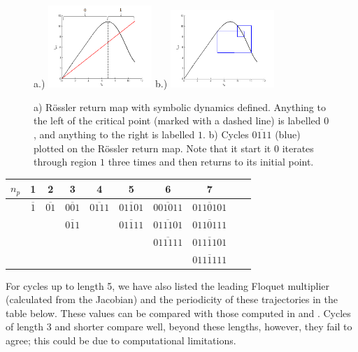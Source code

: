 \documentclass[aip,cha,reprint,
secnumarabic,
nofootinbib, tightenlines,
nobibnotes, showkeys, showpacs,
groupedaddress
]{revtex4-1}
\begin{document}
\begin{figure}[h]
\centering
a.)  \includegraphics[width=0.35\textwidth]{Figs/Section4/kcdemon.png}
b.)  \includegraphics[width=0.35\textwidth]{Figs/Section4/kccycle4ross.png}
\caption{a) R\"ossler return map with symbolic dynamics defined.  Anything to the left of the critical point (marked with a dashed line) is labelled $0$, and anything to the right is labelled $1$. b) Cycles $\overline{0111}$ (blue) plotted on the R\"ossler return map.  Note that it start it $0$ iterates through region $1$ three times and then returns to its initial point.}
 \label{fig:Ross4cycle}
\end{figure}

\begin{center}
  \begin{tabular}{| l | c | c | c | c | c | c | c | c | r| }
    \hline
    $n_p$ & 1 & 2 & 3 & 4 & 5 & 6 & 7\\ \hline
    & $\overline{1}$ & $\overline{01}$ & $\overline{001}$ & $\overline{0111}$ & $\overline{01101}$ & $\overline{001011}$ & $\overline{0110101}$ \\
    &  &   & $\overline{011}$ &  & $\overline{01111}$ & $\overline{011101}$ & $\overline{0110111}$ \\
    &  &  &  &  &  & $\overline{011111}$ & $\overline{0111101}$ \\
    &  &  &  &  &  &  & $\overline{0111111}$ \\
    \hline
  \end{tabular}
\end{center}

For cycles up to length 5, we have also listed the leading Floquet multiplier (calculated from the Jacobian) and the periodicity of these trajectories in the table below.  These values can be compared with those computed in \cite{CB} and \cite{OtherRoss}.  Cycles of length $3$ and shorter compare well, beyond these lengths, however, they fail to agree; this could be due to computational limitations.
\end{document}
